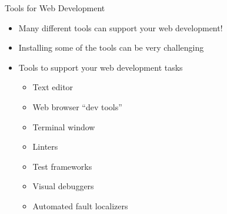 \documentclass[14pt,aspectratio=169]{beamer}
\begin{document}
%
\begin{frame}{Tools for Web Development}
%
  \begin{itemize}
    \item Many different tools can support your web development!
      \vspace*{-.2in}
    \item Installing some of the tools can be very challenging
      \vspace*{-.15in}
    \item Tools to support your web development tasks
      \begin{itemize}
        \item Text editor
        \item Web browser ``dev tools''
        \item Terminal window
        \item Linters
        \item Test frameworks
        \item Visual debuggers
        \item Automated fault localizers
      \end{itemize}
  \end{itemize}
%
\end{frame}
\end{document}
